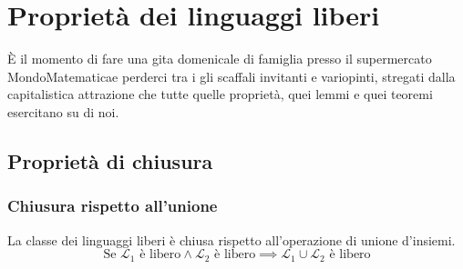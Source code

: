 \documentclass[class=book, crop=false, oneside, 12pt]{standalone}
\begin{document}
\chapter{Proprietà dei linguaggi liberi}
È il momento di fare una gita domenicale di famiglia presso il supermercato MondoMatematica\textregistered e perderci tra i gli scaffali invitanti e variopinti, stregati dalla capitalistica attrazione che tutte quelle proprietà, quei lemmi e quei teoremi esercitano su di noi.
\section{Proprietà di chiusura}
\subsection*{Chiusura rispetto all'unione}
\begin{lemma}
  La classe dei linguaggi liberi è chiusa rispetto all'operazione di unione d'insiemi.
  \begin{equation*}
    \textrm{Se } \mathcal{L}_1 \textrm{ è libero} \land \mathcal{L}_2 \textrm{ è libero} \implies \mathcal{L}_1 \cup \mathcal{L}_2 \textrm{ è libero}
  \end{equation*}
\end{lemma}
\end{document}
